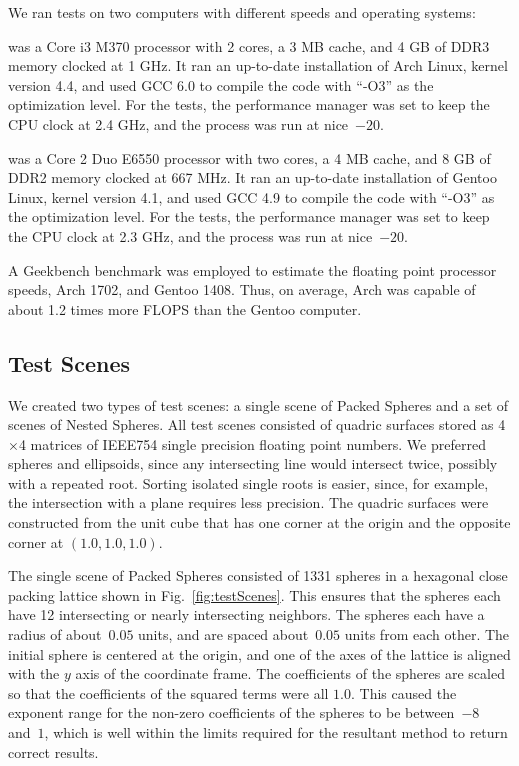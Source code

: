 \documentclass{cccg16}
\begin{document}
We ran tests on two computers with different speeds and operating
systems:

 was a Core i3 M370 processor with 2 cores, a 3 MB
cache, and 4 GB of DDR3 memory clocked at 1 GHz.  It ran an up-to-date
installation of Arch Linux, kernel version 4.4, and used GCC 6.0 to
compile the code with ``-O3'' as the optimization level.  For the
tests, the performance manager was set to keep the CPU clock at 2.4
GHz, and the process was run at nice~$-20$.

 was a Core 2 Duo E6550 processor with two cores,
a 4 MB cache, and 8 GB of DDR2 memory clocked at 667 MHz.  It ran an
up-to-date installation of Gentoo Linux, kernel version 4.1, and used
GCC 4.9 to compile the code with ``-O3'' as the optimization level.
For the tests, the performance manager was set to keep the CPU clock
at 2.3 GHz, and the process was run at nice~$-20$.

A Geekbench benchmark was employed to estimate the floating point
processor speeds, Arch 1702, and Gentoo 1408. Thus, on average, Arch
was capable of about 1.2 times more FLOPS than the Gentoo computer.

\subsection{Test Scenes}
We created two types of test scenes: a single scene of Packed Spheres
and  a set of scenes of Nested Spheres.  All test scenes consisted
of quadric surfaces stored as 4$\times$4 matrices of IEEE754 single precision floating point
numbers.  We preferred spheres and ellipsoids, since any intersecting
line would intersect twice, possibly with a repeated root.  Sorting
isolated single roots is easier, since, for example, the intersection
with a plane requires less precision. The quadric surfaces were
constructed from the unit cube that has one corner at the origin and
the opposite corner at $(1.0, 1.0, 1.0)$.

The single scene of Packed Spheres consisted of 1331 spheres in a
hexagonal close packing lattice shown in Fig.~\ref{fig:testScenes}.
This ensures that the spheres each have 12 intersecting or nearly
intersecting neighbors.  The spheres each have a radius of
about~$0.05$ units, and are spaced about~$0.05$ units from each other.
The initial sphere is centered at the origin, and one of the axes of
the lattice is aligned with the $y$ axis of the coordinate frame.  The
coefficients of the spheres are scaled so that the coefficients of the
squared terms were all $1.0$. This caused the exponent range for the
non-zero coefficients of the spheres to be between~$-8$ and~$1$, which
is well within the limits required for the resultant method to return
correct results.
\end{document}
